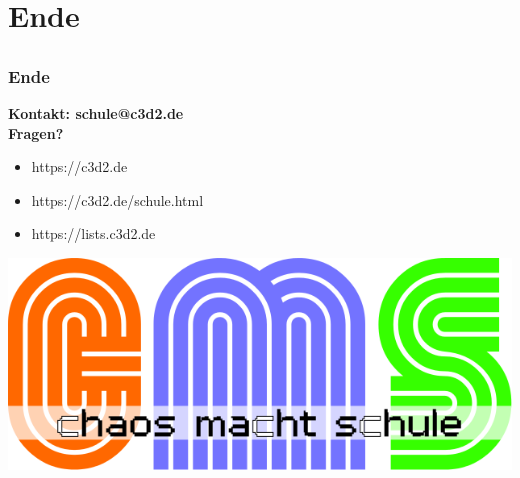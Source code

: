 \documentclass[12pt]{beamer}
\begin{document}
\section{Ende}
	\subsection{}
  
\begin{frame}
	\frametitle{Ende}
	\begin{center}
		\textbf{Kontakt: schule@c3d2.de} \\
		\textbf{Fragen?} 
	\end{center}
	\begin{itemize}
		\item<1-> https://c3d2.de
		\item<2-> https://c3d2.de/schule.html
		\item<4-> https://lists.c3d2.de
	\end{itemize}
\end{frame}

\begin{frame}
	\begin{center}
    	\includegraphics[height=0.5\textheight]{img//cms-text.png}
    \end{center}
\end{frame}
\end{document}
